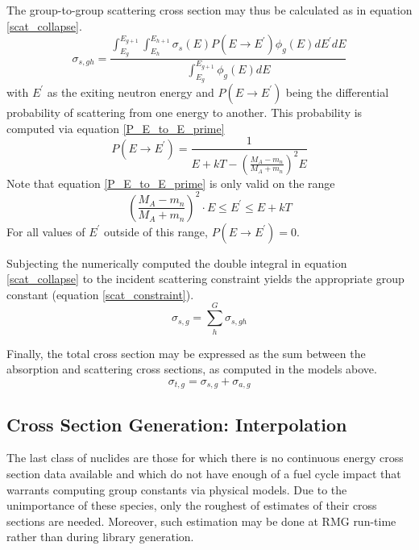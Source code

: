 The group-to-group scattering cross section may thus be calculated as in equation \ref{scat_collapse}.
\begin{equation}
\label{scat_collapse}
\sigma_{s,gh} = \frac{\int_{E_g}^{E_{g+1}} \int_{E_h}^{E_{h+1}} \sigma_s(E) P(E \to E^\prime) \phi_g(E) dE^\prime dE}
                     {\int_{E_g}^{E_{g+1}} \phi_g(E) dE}
\end{equation}
with $E^\prime$ as the exiting neutron energy and $P(E \to E^\prime)$ being the differential probability of 
scattering from one energy to another.  This probability is computed via equation \ref{P_E_to_E_prime}
\begin{equation}
\label{P_E_to_E_prime}
P(E \to E^\prime) = \frac{1}{E + kT - \left(\frac{M_A - m_n}{M_A + m_n}\right)^2 E}
\end{equation}
Note that equation \ref{P_E_to_E_prime} is only valid on the range 
\begin{equation}
\label{P_E_to_E_prime_range}
\left(\frac{M_A - m_n}{M_A + m_n}\right)^2 \cdot E \le E^\prime \le E + kT
\end{equation}
For all values of $E^\prime$ outside of this range, $P(E \to E^\prime) = 0$.

Subjecting the numerically computed the double integral in equation \ref{scat_collapse} 
to the incident scattering constraint yields the appropriate group constant (equation \ref{scat_constraint}).
\begin{equation}
\label{scat_constraint}
\sigma_{s,g} = \sum_h^G \sigma_{s,gh}
\end{equation}

Finally, the total cross section may be expressed as the sum between the absorption and scattering
cross sections, as computed in the models above.
\begin{equation}
\label{tot_xs_model}
\sigma_{t,g} = \sigma_{s,g} + \sigma_{a,g}
\end{equation}

\subsection{Cross Section Generation: Interpolation}
\label{mg:xs_gen_interpolation}
The last class of nuclides are those for which there is no continuous energy cross section data 
available and which do not have enough of a fuel cycle impact that warrants computing group constants 
via physical models.  Due to the unimportance of these species, only the roughest of estimates
of their cross sections are needed.  Moreover, such estimation may be done at RMG run-time rather 
than during library generation.

